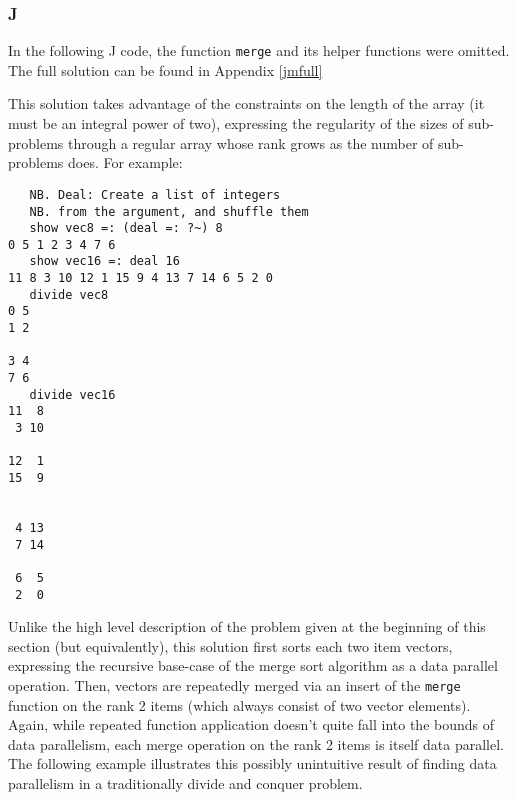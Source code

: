 \subsubsection{J}
\label{jmerge}
In the following J code, the function \texttt{merge} and its helper functions were omitted.
The full solution can be found in Appendix \ref{jmfull}

\begin{singlespacing}
\begin{small}

\end{small}
\end{singlespacing}

This solution takes advantage of the constraints on the length of the array (it must be an integral power of two), 
expressing the regularity of the sizes of sub-problems through a regular array 
whose rank grows as the number of sub-problems does.
For example: 

\begin{singlespacing}
\begin{small}
\begin{verbatim}
   NB. Deal: Create a list of integers
   NB. from the argument, and shuffle them
   show vec8 =: (deal =: ?~) 8
0 5 1 2 3 4 7 6
   show vec16 =: deal 16
11 8 3 10 12 1 15 9 4 13 7 14 6 5 2 0
   divide vec8
0 5
1 2

3 4
7 6
   divide vec16
11  8
 3 10

12  1
15  9


 4 13
 7 14

 6  5
 2  0
\end{verbatim}
\end{small}
\end{singlespacing}

Unlike the high level description of the problem given at the beginning of this section (but equivalently), 
this solution first sorts each two item vectors, 
expressing the recursive base-case of the merge sort algorithm as a data parallel operation.
Then, vectors are repeatedly merged via an insert of the \texttt{merge} function on the rank 2 items 
(which always consist of two vector elements).
Again, while repeated function application doesn't quite fall into the bounds of data parallelism, 
each merge operation on the rank 2 items is itself data parallel. 
The following example illustrates this possibly unintuitive result of finding data parallelism 
in a traditionally divide and conquer problem.

